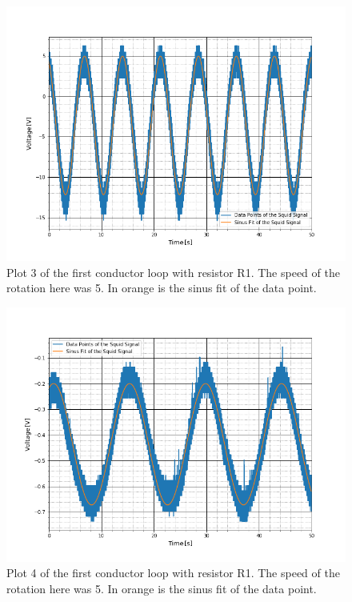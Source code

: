 \begin{figure}[ht]
	\includegraphics[scale=0.5]{Bild/r1_5_3}
	\centering
	\caption[Plot of first conductor loop 3]{Plot 3 of the first conductor loop with resistor R1. The speed of the rotation here was 5. In orange is the sinus fit of the data point.}
\end{figure}
\begin{figure}[ht]
	\includegraphics[scale=0.5]{Bild/r1_5_4}
	\centering
	\caption[Plot of first conductor loop 4]{Plot 4 of the first conductor loop with resistor R1. The speed of the rotation here was 5. In orange is the sinus fit of the data point.}
\end{figure}
